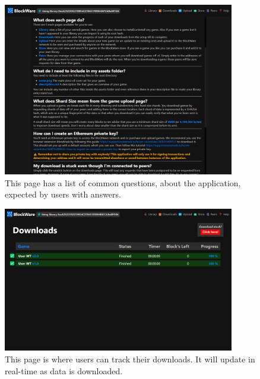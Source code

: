 \begin{figure}[H]
  \centering
  \includegraphics[width=0.9\textwidth]{assets/images/screenshots/help.png}
  \caption{This page has a list of common questions, about the application, expected by users with answers.}
\end{figure}

\begin{figure}[H]
  \centering
  \includegraphics[width=0.9\textwidth]{assets/images/screenshots/downloads.png}
  \caption{This page is where users can track their downloads. It will update in real-time as data is downloaded.}
\end{figure}

